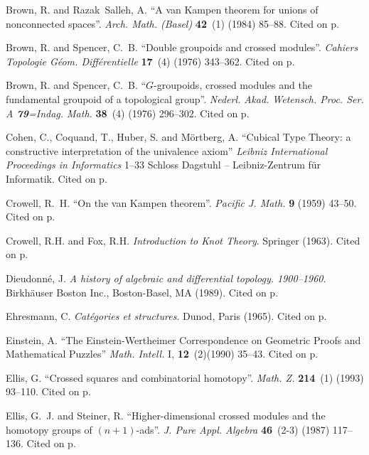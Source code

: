 \documentclass{elsarticle}
\begin{document}
\begin{thebibliography}{MLW50}
Brown, R. and Razak~Salleh, A.
\newblock \enquote{A van {K}ampen theorem for unions of nonconnected spaces}.
\newblock \emph{Arch. Math. (Basel)} \textbf{42}~(1) (1984) 85--88.  Cited on p.

Brown, R. and Spencer, C.~B.
\newblock \enquote{Double groupoids and crossed modules}.
\newblock \emph{Cahiers Topologie G\'eom. Diff\'erentielle} \textbf{17}~(4)
  (1976) 343--362.  Cited on p.

Brown, R. and Spencer, C.~B.
\newblock \enquote{{$G$}-groupoids, crossed modules and the fundamental
  groupoid of a topological group}.
\newblock \emph{Nederl. Akad. Wetensch. Proc. Ser. A {\bf 79}=Indag. Math.}
  \textbf{38}~(4) (1976) 296--302.  Cited on p.

   Cohen, C., Coquand, T., Huber, S. and M\"ortberg, A.
 \newblock \enquote{Cubical Type Theory: a constructive interpretation of the univalence axiom}
 \newblock \emph{Leibniz International Proceedings in Informatics}  1--33
 Schloss Dagstuhl – Leibniz-Zentrum für Informatik. Cited on p.

Crowell, R.~H.
\newblock \enquote{On the van {K}ampen theorem}.
\newblock \emph{Pacific J. Math.} \textbf{9} (1959) 43--50.  Cited on p.

Crowell, R.H. and Fox, R.H.
\newblock \emph{Introduction to Knot Theory}. Springer (1963).  Cited on p.


Dieudonn{\'e}, J.
\newblock \emph{A history of algebraic and differential topology. 1900--1960}.
\newblock Birkh\"auser Boston Inc., Boston-Basel, MA (1989).  Cited on p.

Ehresmann, C.
\newblock \emph{Cat\'egories et structures}.
\newblock Dunod, Paris (1965).  Cited on p.

Einstein, A.
\newblock \enquote{The Einstein-Wertheimer Correspondence on Geometric Proofs and Mathematical Puzzles}
\newblock \emph{Math. Intell.} I, \textbf{12}~(2)(1990) 35--43.  Cited on p.

Ellis, G.
\newblock \enquote{Crossed squares and combinatorial homotopy}.
\newblock \emph{Math. Z.} \textbf{214}~(1) (1993) 93--110.  Cited on p.

Ellis, G.~J. and Steiner, R.
\newblock \enquote{Higher-dimensional crossed modules and the homotopy groups
  of {$(n+1)$}-ads}.
\newblock \emph{J. Pure Appl. Algebra} \textbf{46}~(2-3) (1987) 117--136.  Cited on p.


\end{thebibliography}
\end{document}
